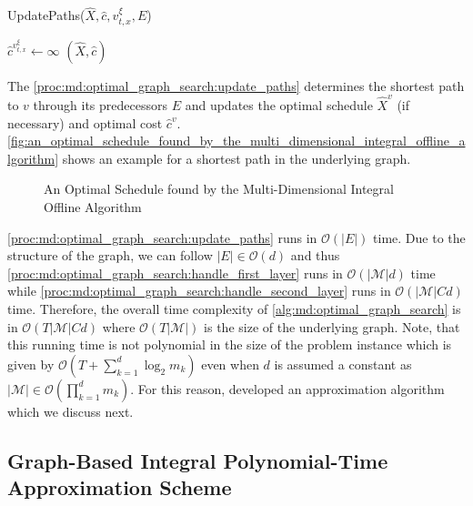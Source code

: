 \begin{function}
	\caption{UpdatePaths($\hat{X}, \hat{c}, v_{t,x}^{\xi}, E$)}\label{proc:md:optimal_graph_search:update_paths}
	$\hat{c}^{v_{t,x}^{\xi}} \gets \infty$\;
    \Return $(\hat{X}, \hat{c})$\;
\end{function}

The \autoref{proc:md:optimal_graph_search:update_paths} determines the shortest path to $v$ through its predecessors $E$ and updates the optimal schedule $\hat{X}^v$ (if necessary) and optimal cost $\hat{c}^v$. \autoref{fig:an_optimal_schedule_found_by_the_multi_dimensional_integral_offline_algorithm} shows an example for a shortest path in the underlying graph.

\begin{figure}
    \centering
    [TODO]
    \caption{An Optimal Schedule found by the Multi-Dimensional Integral Offline Algorithm}
    \label{fig:an_optimal_schedule_found_by_the_multi_dimensional_integral_offline_algorithm}
\end{figure}

\ref{proc:md:optimal_graph_search:update_paths} runs in $\mathcal{O}(|E|)$ time. Due to the structure of the graph, we can follow $|E| \in \mathcal{O}(d)$ and thus \ref{proc:md:optimal_graph_search:handle_first_layer} runs in $\mathcal{O}(|\mathcal{M}| d)$ time while \ref{proc:md:optimal_graph_search:handle_second_layer} runs in $\mathcal{O}(|\mathcal{M}| C d)$ time. Therefore, the overall time complexity of \autoref{alg:md:optimal_graph_search} is in $\mathcal{O}(T |\mathcal{M}| C d)$ where $\mathcal{O}(T |\mathcal{M}|)$ is the size of the underlying graph. Note, that this running time is not polynomial in the size of the problem instance which is given by $\mathcal{O}(T + \sum_{k=1}^d \log_2 m_k)$ even when $d$ is assumed a constant as $|\mathcal{M}| \in \mathcal{O}(\prod_{k=1}^d m_k)$. For this reason, \citeauthor*{Albers2021_2} developed an approximation algorithm which we discuss next.

\subsection{Graph-Based Integral Polynomial-Time Approximation Scheme}

